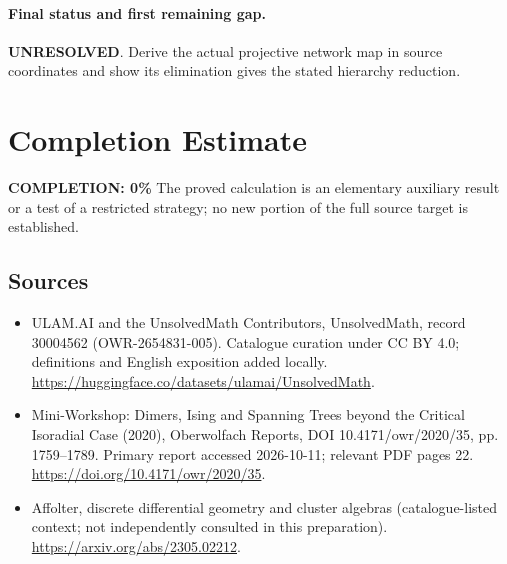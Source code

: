 \documentclass[11pt]{article}
\begin{document}
\paragraph{Final status and first remaining gap.}
\textbf{UNRESOLVED}. Derive the actual projective network map in source coordinates and show its elimination gives the stated hierarchy reduction.

\section{Completion Estimate}
\noindent\textbf{COMPLETION: 0\%}
The proved calculation is an elementary auxiliary result or a test of a restricted strategy; no new portion of the full source target is established.

\subsection{Sources}
\begin{itemize}
\item[\hypertarget{source:30004562:1}{S1}] ULAM.AI and the UnsolvedMath Contributors, UnsolvedMath, record 30004562 (OWR-2654831-005). Catalogue curation under CC BY 4.0; definitions and English exposition added locally.
\url{https://huggingface.co/datasets/ulamai/UnsolvedMath}.
\item[\hypertarget{source:30004562:2}{S2}] Mini-Workshop: Dimers, Ising and Spanning Trees beyond the Critical Isoradial Case (2020), Oberwolfach Reports, DOI 10.4171/owr/2020/35, pp. 1759--1789. Primary report accessed 2026-10-11; relevant PDF pages 22.
\url{https://doi.org/10.4171/owr/2020/35}.
\item[\hypertarget{source:30004562:3}{S3}] Affolter, discrete differential geometry and cluster algebras (catalogue-listed context; not independently consulted in this preparation).
\url{https://arxiv.org/abs/2305.02212}.
\end{itemize}
\label{end:30004562}
\end{document}
